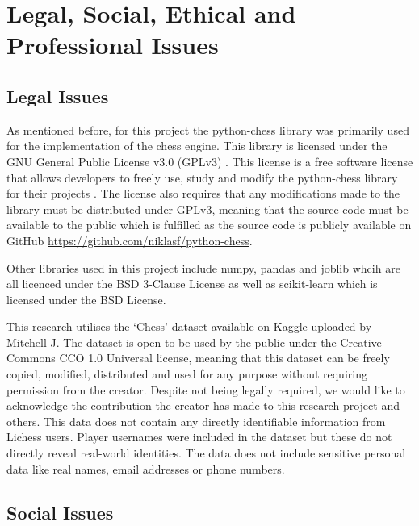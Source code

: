 \chapter{Legal, Social, Ethical and Professional Issues}
\section{Legal Issues}

As mentioned before, for this project the python-chess library was primarily used for the implementation of the chess engine. This library is licensed under the GNU General Public License v3.0 (GPLv3) \cite{PythonchessPurePython}. This license is a free software license that allows developers to freely use, study and modify the python-chess library for their projects \cite{GNUGeneralPublic}. The license also requires that any modifications made to the library must be distributed under GPLv3, meaning that the source code must be available to the public which is fulfilled as the source code is publicly available on GitHub \cite{fiekasNiklasfPythonchess2025} \url{https://github.com/niklasf/python-chess}. 

Other libraries used in this project include numpy, pandas and joblib whcih are all licenced under the BSD 3-Clause License as well as scikit-learn which is licensed under the BSD License.

This research utilises the `Chess' dataset available on Kaggle \cite{ChessGameDataset} uploaded by Mitchell J. The dataset is open to be used by the public under the Creative Commons CCO 1.0 Universal license, meaning that this dataset can be freely copied, modified, distributed and used for any purpose without requiring permission from the creator. Despite not being legally required, we would like to acknowledge the contribution the creator has made to this research project and others. This data does not contain any directly identifiable information from Lichess users. Player usernames were included in the dataset but these do not directly reveal real-world identities. The data does not include sensitive personal data like real names, email addresses or phone numbers.

\section{Social Issues}

